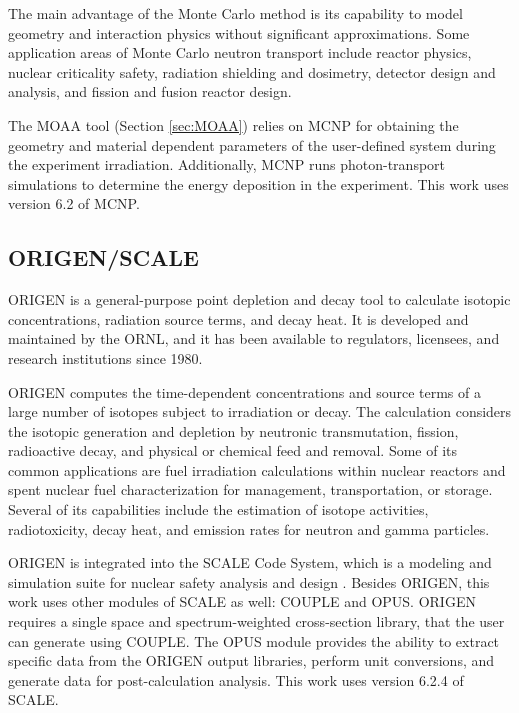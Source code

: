 The main advantage of the Monte Carlo method is its capability to model geometry and interaction physics without significant approximations.
Some application areas of Monte Carlo neutron transport include reactor physics, nuclear criticality safety, radiation shielding and dosimetry, detector design and analysis, and fission and fusion reactor design.

The \gls*{MOAA} tool (Section \ref{sec:MOAA}) relies on MCNP for obtaining the geometry and material dependent parameters of the user-defined system during the experiment irradiation.
Additionally, MCNP runs photon-transport simulations to determine the energy deposition in the experiment.
This work uses version 6.2 of MCNP.


\subsection{ORIGEN/SCALE}

ORIGEN is a general-purpose point depletion and decay tool to calculate isotopic concentrations, radiation source terms, and decay heat.
It is developed and maintained by the \gls*{ORNL}, and it has been available to regulators, licensees, and research institutions since 1980.

ORIGEN computes the time-dependent concentrations and source terms of a large number of isotopes subject to irradiation or decay.
The calculation considers the isotopic generation and depletion by neutronic transmutation, fission, radioactive decay, and physical or chemical feed and removal.
Some of its common applications are fuel irradiation calculations within nuclear reactors and spent nuclear fuel characterization for management, transportation, or storage.
Several of its capabilities include the estimation of isotope activities, radiotoxicity, decay heat, and emission rates for neutron and gamma particles.

ORIGEN is integrated into the SCALE Code System, which is a modeling and simulation suite for nuclear safety analysis and design \cite{scale}.
Besides ORIGEN, this work uses other modules of SCALE as well: COUPLE and OPUS.
ORIGEN requires a single space and spectrum-weighted cross-section library, that the user can generate using COUPLE.
The OPUS module provides the ability to extract specific data from the ORIGEN output libraries, perform unit conversions, and generate data for post-calculation analysis.
This work uses version 6.2.4 of SCALE.


